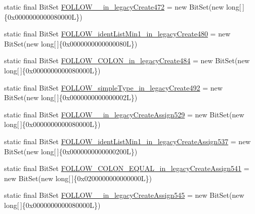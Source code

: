 \begin{DoxyCompactItemize}
\item 
static final Bit\-Set \hyperlink{classorg_1_1tzi_1_1use_1_1parser_1_1shell_1_1_shell_command_parser_aaf57246e3beb541a8f2998d95eb91324}{F\-O\-L\-L\-O\-W\-\_\-\_\-in\-\_\-legacy\-Create472} = new Bit\-Set(new long\mbox{[}$\,$\mbox{]}\{0x0000000000080000\-L\})
\item 
static final Bit\-Set \hyperlink{classorg_1_1tzi_1_1use_1_1parser_1_1shell_1_1_shell_command_parser_a7d8ea7b38c2dd7d95a08d33aa43de27f}{F\-O\-L\-L\-O\-W\-\_\-ident\-List\-Min1\-\_\-in\-\_\-legacy\-Create480} = new Bit\-Set(new long\mbox{[}$\,$\mbox{]}\{0x0000000000000080\-L\})
\item 
static final Bit\-Set \hyperlink{classorg_1_1tzi_1_1use_1_1parser_1_1shell_1_1_shell_command_parser_a8f49a26ef9f30e0c90108bdc8b44ace1}{F\-O\-L\-L\-O\-W\-\_\-\-C\-O\-L\-O\-N\-\_\-in\-\_\-legacy\-Create484} = new Bit\-Set(new long\mbox{[}$\,$\mbox{]}\{0x0000000000080000\-L\})
\item 
static final Bit\-Set \hyperlink{classorg_1_1tzi_1_1use_1_1parser_1_1shell_1_1_shell_command_parser_a1eb29ae8f4a005998e8b4f97c7732d4c}{F\-O\-L\-L\-O\-W\-\_\-simple\-Type\-\_\-in\-\_\-legacy\-Create492} = new Bit\-Set(new long\mbox{[}$\,$\mbox{]}\{0x0000000000000002\-L\})
\item 
static final Bit\-Set \hyperlink{classorg_1_1tzi_1_1use_1_1parser_1_1shell_1_1_shell_command_parser_a1dfa1292e892338854555142f7f9387e}{F\-O\-L\-L\-O\-W\-\_\-\_\-in\-\_\-legacy\-Create\-Assign529} = new Bit\-Set(new long\mbox{[}$\,$\mbox{]}\{0x0000000000080000\-L\})
\item 
static final Bit\-Set \hyperlink{classorg_1_1tzi_1_1use_1_1parser_1_1shell_1_1_shell_command_parser_ab82976d06f343ba9272dc7cd2592734a}{F\-O\-L\-L\-O\-W\-\_\-ident\-List\-Min1\-\_\-in\-\_\-legacy\-Create\-Assign537} = new Bit\-Set(new long\mbox{[}$\,$\mbox{]}\{0x0000000000000200\-L\})
\item 
static final Bit\-Set \hyperlink{classorg_1_1tzi_1_1use_1_1parser_1_1shell_1_1_shell_command_parser_afaa88b14216d18e3cc8be5278393434e}{F\-O\-L\-L\-O\-W\-\_\-\-C\-O\-L\-O\-N\-\_\-\-E\-Q\-U\-A\-L\-\_\-in\-\_\-legacy\-Create\-Assign541} = new Bit\-Set(new long\mbox{[}$\,$\mbox{]}\{0x0200000000000000\-L\})
\item 
static final Bit\-Set \hyperlink{classorg_1_1tzi_1_1use_1_1parser_1_1shell_1_1_shell_command_parser_a0b567d79c179a08c9ef58cd325f5a01e}{F\-O\-L\-L\-O\-W\-\_\-\_\-in\-\_\-legacy\-Create\-Assign545} = new Bit\-Set(new long\mbox{[}$\,$\mbox{]}\{0x0000000000080000\-L\})
\item 

\end{DoxyCompactItemize}
